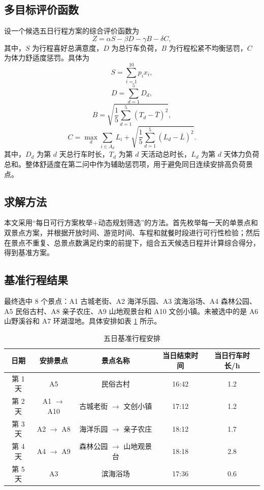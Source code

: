 \documentclass[UTF8,a4paper,12pt]{ctexart}
\begin{document}
\subsection{多目标评价函数}

设一个候选五日行程方案的综合评价函数为
\begin{equation}
Z=\alpha S-\beta D-\gamma B-\delta C,
\end{equation}
其中，$S$ 为行程喜好总满意度，$D$ 为总行车负荷，$B$ 为行程松紧不均衡惩罚，$C$ 为体力舒适度惩罚。具体为
\begin{equation}
S=\sum_{i=1}^{10}p_ix_i,
\end{equation}
\begin{equation}
D=\sum_{d=1}^{5}D_d,
\end{equation}
\begin{equation}
B=\sqrt{\frac{1}{5}\sum_{d=1}^{5}(T_d-\bar T)^2},
\end{equation}
\begin{equation}
C=\max_d\sum_{i\in A_d}L_i+\sqrt{\frac{1}{5}\sum_{d=1}^{5}(L_d-\bar L)^2}.
\end{equation}
其中，$D_d$ 为第 $d$ 天总行车时长，$T_d$ 为第 $d$ 天活动总时长，$L_d$ 为第 $d$ 天体力负荷总和。整体舒适度在第二问中作为辅助惩罚项，用于避免同日连续安排高负荷景点。

\subsection{求解方法}

本文采用“每日可行方案枚举+动态规划筛选”的方法。首先枚举每一天的单景点和双景点方案，并根据开放时间、游览时间、车程和就餐时段进行可行性检验；然后在景点不重复、总景点数满足约束的前提下，组合五天候选日程并计算综合得分，得到基准方案。

\subsection{基准行程结果}

最终选中 8 个景点：A1 古城老街、A2 海洋乐园、A3 滨海浴场、A4 森林公园、A5 民俗古村、A8 亲子农庄、A9 山地观景台和 A10 文创小镇。未被选中的是 A6 山野溪谷和 A7 环湖湿地。具体安排如表 \ref{tab:q2plan} 所示。

\begin{table}[H]
\centering
\caption{五日基准行程安排}
\label{tab:q2plan}
\begin{tabular}{ccccc}
\toprule
日期 & 安排景点 & 景点名称 & 当日结束时间 & 当日行车时长/h \\
\midrule
第 1 天 & A5 & 民俗古村 & 16:42 & 1.2 \\
第 2 天 & A1 $\rightarrow$ A10 & 古城老街 $\rightarrow$ 文创小镇 & 17:12 & 1.2 \\
第 3 天 & A2 $\rightarrow$ A8 & 海洋乐园 $\rightarrow$ 亲子农庄 & 18:12 & 1.7 \\
第 4 天 & A4 $\rightarrow$ A9 & 森林公园 $\rightarrow$ 山地观景台 & 18:18 & 2.8 \\
第 5 天 & A3 & 滨海浴场 & 17:36 & 0.6 \\
\bottomrule
\end{tabular}
\end{table}
\end{document}
